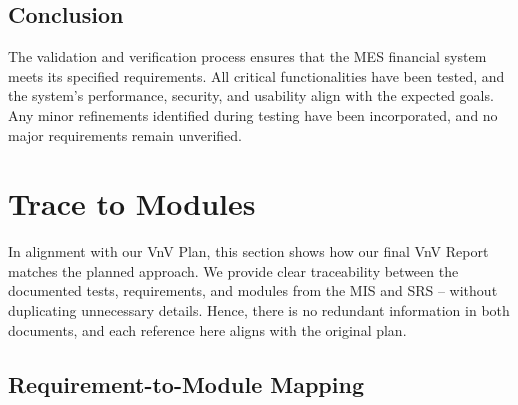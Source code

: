 \documentclass[12pt, titlepage]{article}
\begin{document}
\subsection{Conclusion}

The validation and verification process ensures that the MES financial system meets its specified requirements. All critical functionalities have been tested, and the system's performance, security, and usability align with the expected goals. Any minor refinements identified during testing have been incorporated, and no major requirements remain unverified.

		
\section{Trace to Modules}
\label{sec:TraceToModules}

In alignment with our VnV Plan, this section shows how our final VnV Report
matches the planned approach. We provide clear traceability between
the documented tests, requirements, and modules from the MIS and SRS –
without duplicating unnecessary details. Hence, there is no redundant
information in both documents, and each reference here aligns with the
original plan.

\subsection{Requirement-to-Module Mapping}
\end{document}
